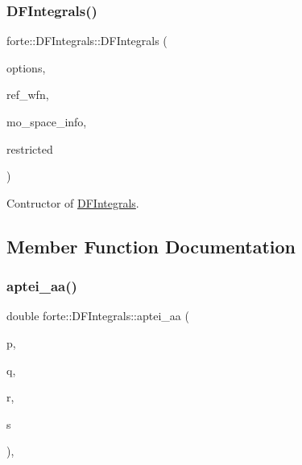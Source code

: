 \subsubsection{\texorpdfstring{D\+F\+Integrals()}{DFIntegrals()}}
{\footnotesize\ttfamily forte\+::\+D\+F\+Integrals\+::\+D\+F\+Integrals (\begin{DoxyParamCaption}\item[{std\+::shared\+\_\+ptr$<$ \mbox{\hyperlink{classforte_1_1_forte_options}{Forte\+Options}} $>$}]{options,  }\item[{std\+::shared\+\_\+ptr$<$ psi\+::\+Wavefunction $>$}]{ref\+\_\+wfn,  }\item[{std\+::shared\+\_\+ptr$<$ \mbox{\hyperlink{classforte_1_1_m_o_space_info}{M\+O\+Space\+Info}} $>$}]{mo\+\_\+space\+\_\+info,  }\item[{\mbox{\hyperlink{namespaceforte_a7defa2660dd3eb07aa81176b90781be7}{Integral\+Spin\+Restriction}}}]{restricted }\end{DoxyParamCaption})}



Contructor of \mbox{\hyperlink{classforte_1_1_d_f_integrals}{D\+F\+Integrals}}. 



\subsection{Member Function Documentation}
\mbox{\label{classforte_1_1_d_f_integrals_aa495745fe55286ec7b4ff10ec6d22fae}} 
\subsubsection{\texorpdfstring{aptei\+\_\+aa()}{aptei\_aa()}}
{\footnotesize\ttfamily double forte\+::\+D\+F\+Integrals\+::aptei\+\_\+aa (\begin{DoxyParamCaption}\item[{size\+\_\+t}]{p,  }\item[{size\+\_\+t}]{q,  }\item[{size\+\_\+t}]{r,  }\item[{size\+\_\+t}]{s }\end{DoxyParamCaption})\hspace{0.3cm}{\ttfamily [override]}, {\ttfamily [virtual]}}



